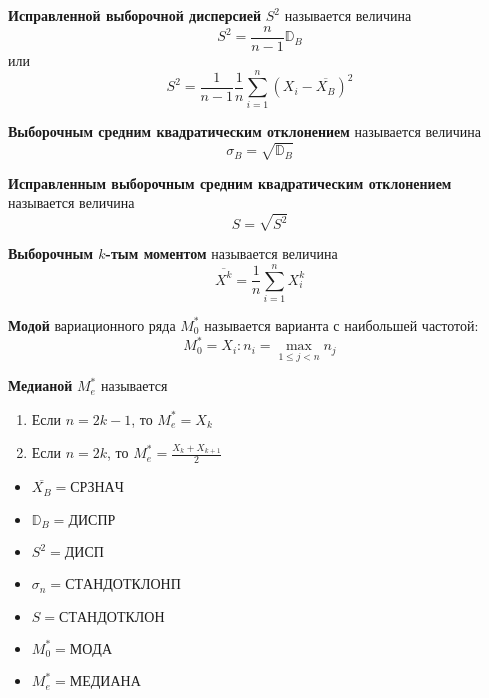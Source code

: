 \begin{definition}
    \textbf{Исправленной выборочной дисперсией} \(S^2\) называется величина
    \[S^2 = \frac{n}{n - 1} \mathbb{D}_B\]
    или
    \[S^2 = \frac{1}{n - 1} \frac{1}{n} \sum_{i=1}^{n} (X_i - \overline{X_B})^2\]
\end{definition}

\begin{definition}
    \textbf{Выборочным средним квадратическим отклонением} называется величина
    \[\sigma_B = \sqrt{\mathbb{D}_B}\]
\end{definition}

\begin{definition}
    \textbf{Исправленным выборочным средним квадратическим отклонением} называется величина
    \[S = \sqrt{S^2}\]
\end{definition}

\begin{definition}
    \textbf{Выборочным \(k\)-тым моментом} называется величина
    \[\overline{X^k} = \frac{1}{n}\sum_{i=1}^{n} X_i^k\]
\end{definition}

\begin{definition}
    \textbf{Модой} вариационного ряда \(M_0^*\) называется варианта с наибольшей частотой:
    \[M_0^* = X_i : n_i = \max_{1 \leq j < n} n_j\]
\end{definition}

\begin{definition}
    \textbf{Медианой} \(M_e^*\) называется \?
    \begin{enumerate}
        \item Если \(n = 2k - 1\), то \(M_e^* = X_k\)
        \item Если \(n = 2k\), то \(M_e^* = \frac{X_k + X_{k + 1}}{2}\)
    \end{enumerate}
\end{definition}

\begin{remark}\itemfix
    \begin{itemize}
        \item \(\overline{X_B} = \mathrm{СРЗНАЧ}\)
        \item \(\mathbb{D}_B = \mathrm{ДИСПР}\)
        \item \(S^2 = \mathrm{ДИСП}\)
        \item \(\sigma_n = \mathrm{СТАНДОТКЛОНП}\)
        \item \(S = \mathrm{СТАНДОТКЛОН}\)
        \item \(M_0^* = \mathrm{МОДА}\)
        \item \(M_e^* = \mathrm{МЕДИАНА}\)
    \end{itemize}
\end{remark}

